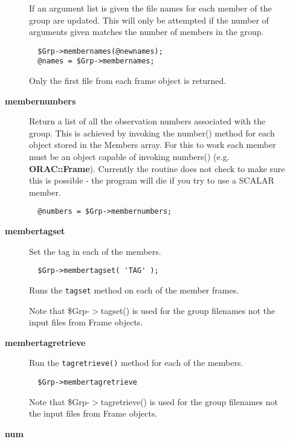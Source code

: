 \begin{description}
\begin{description}
If an argument list is given the file names for each member of the
group are updated. This will only be attempted if the number of 
arguments given matches the number of members in the group.

\begin{verbatim}
  $Grp->membernames(@newnames);
  @names = $Grp->membernames;
\end{verbatim}


Only the first file from each frame object is returned.


\item[{\textbf{membernumbers}}] \mbox{}

Return a list of all the observation numbers associated with
the group. This is achieved by invoking the number() method for
each object stored in the Members array.
For this to work each member must be an object capable of invoking
numbers() (e.g. \textbf{ORAC::Frame}). Currently the routine does not check
to make sure this is possible - the program will die if you try
to use a SCALAR member.

\begin{verbatim}
  @numbers = $Grp->membernumbers;
\end{verbatim}

\item[{\textbf{membertagset}}] \mbox{}

Set the tag in each of the members.

\begin{verbatim}
  $Grp->membertagset( 'TAG' );
\end{verbatim}


Runs the \texttt{tagset} method on each of the member frames.



Note that \$Grp-$>$tagset() is used for the group filenames
not the input files from Frame objects.


\item[{\textbf{membertagretrieve}}] \mbox{}

Run the \texttt{tagretrieve()} method for each of the members.

\begin{verbatim}
  $Grp->membertagretrieve
\end{verbatim}


Note that \$Grp-$>$tagretrieve() is used for the group filenames
not the input files from Frame objects.


\item[{\textbf{num}}] \mbox{}


\end{description}
\end{description}
